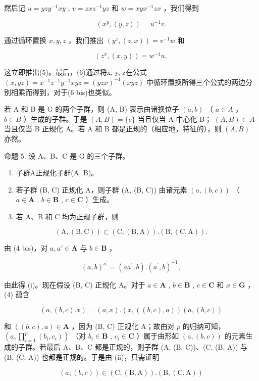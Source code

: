 然后记 \(u = yzy^{-1}xy\) , \(v = zxz^{-1}yz\) 和 \(w = xyx^{-1}zx\) ，我们得到

\[
(x ^ {y}, (y, z)) = u ^ {- 1} v.
\]

通过循环置换 \(x, y, z\) ，我们推出 \((y^z, (z, x)) = v^{-1}w\) 和

\[
\left(z ^ {x}, (x, y)\right) = w ^ {- 1} u,
\]

这立即推出(5)。最后，(6)通过将x, y, z在公式 \((x, yz) = x^{-1}z^{-1}y^{-1}xyz = (yzx)^{-1}(xyz)\) 中循环置换所得三个公式的两边分别相乘而得到，对于(6 bis)也类似。

若 A 和 B 是 G 的两个子群，则 (A, B) 表示由诸换位子 \((a, b)\) （ \(a \in A\) ， \(b \in B\) ）生成的子群。于是 \((A, B) = \{e\}\) 当且仅当 A 中心化 B； \((A, B) \subset A\) 当且仅当 B 正规化 A。若 A 和 B 都是正规的（相应地，特征的），则 \((A, B)\) 亦然。

命题 5. 设 A、B、C 是 G 的三个子群。

\begin{enumerate}
\def\labelenumi{(\roman{enumi})}
\item
  子群A正规化子群(A, B)。
\item
  若子群 (B, C) 正规化 A，则子群 (A, (B, C)) 由诸元素 \((a, (b, c))\) （ \(a \in \mathbf{A}\) , \(b \in \mathbf{B}\) , \(c \in \mathbf{C}\) ）生成。
\item
  若 A、B 和 C 均为正规子群，则
\end{enumerate}

\[
(\mathrm{A}, (\mathrm{B}, \mathrm{C})) \subset (\mathrm{C}, (\mathrm{B}, \mathrm{A})). (\mathrm{B}, (\mathrm{C}, \mathrm{A})).
\]

由 (4 bis)，对 \(a, a' \in \mathbf{A}\) 与 \(b \in \mathbf{B}\) ，

\[
(a, b) ^ {a ^ {\prime}} = (a a ^ {\prime}, b). (a ^ {\prime}, b) ^ {- 1},
\]

由此得 (i)。现在假设 (B, C) 正规化 A。对于 \(a \in \mathbf{A}\) , \(b \in \mathbf{B}\) , \(c \in \mathbf{C}\) 和 \(x \in \mathbf{G}\) ，(4) 蕴含

\[
(a, (b, c). x) = (a, x). (x, ((b, c), a)) (a, (b, c))
\]

和 \(((b, c), a) \in \mathbf{A}\) ，因为 (B, C) 正规化 A；故由对 \(p\) 的归纳可知， \(\left(a, \prod_{i=1}^{p} (b_i, c_i)\right)\) （对 \(b_i \in \mathbf{B}\) , \(c_i \in \mathbf{C}\) ）属于由形如 \((a, (b, c))\) 的元素生成的子群。若最后 A、B、C 都是正规的，则子群 (A, (B, C))、(C, (B, A)) 与 (B, (C, A)) 也都是正规的。于是由 (ii)，只需证明

\[
(a, (b, c)) \in (\mathrm{C}, (\mathrm{B}, \mathrm{A})). (\mathrm{B}, (\mathrm{C}, \mathrm{A}))
\]

